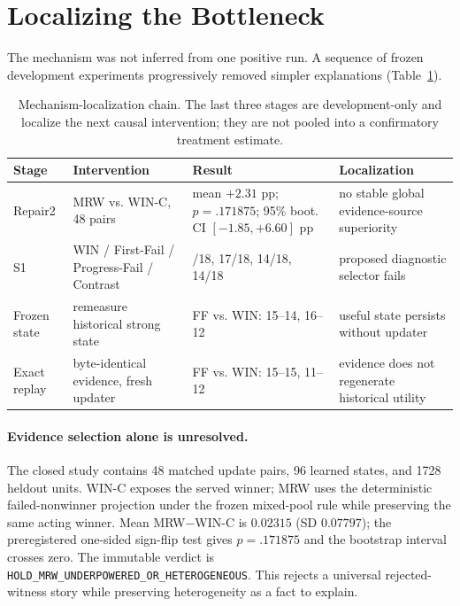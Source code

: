 \section{Localizing the Bottleneck}
\label{sec:localization}

The mechanism was not inferred from one positive run. A sequence of frozen development experiments progressively removed simpler explanations (Table~\ref{tab:evidence-chain}).

\begin{table}[t]
\centering
\footnotesize
\setlength{\tabcolsep}{3pt}
\begin{tabularx}{\linewidth}{>{\raggedright\arraybackslash}p{1.55cm}>{\raggedright\arraybackslash}X>{\raggedright\arraybackslash}X>{\raggedright\arraybackslash}X}
\toprule
Stage & Intervention & Result & Localization \\
\midrule
Repair2 & MRW vs. WIN-C, 48 pairs & mean $+2.31$ pp; $p=.171875$; 95\% boot. CI $[-1.85,+6.60]$ pp & no stable global evidence-source superiority \\
S1 & WIN / First-Fail / Progress-Fail / Contrast & 13/18, 17/18, 14/18, 14/18 & proposed diagnostic selector fails \\
Frozen state & remeasure historical strong state & FF vs. WIN: 15--14, 16--12 & useful state persists without updater \\
Exact replay & byte-identical evidence, fresh updater & FF vs. WIN: 15--15, 11--12 & evidence does not regenerate historical utility \\
\bottomrule
\end{tabularx}
\caption{Mechanism-localization chain. The last three stages are development-only and localize the next causal intervention; they are not pooled into a confirmatory treatment estimate.}
\label{tab:evidence-chain}
\end{table}

\paragraph{Evidence selection alone is unresolved.}
The closed study contains 48 matched update pairs, 96 learned states, and 1728 heldout units. WIN-C exposes the served winner; MRW uses the deterministic failed-nonwinner projection under the frozen mixed-pool rule while preserving the same acting winner. Mean MRW$-$WIN-C is $0.02315$ (SD $0.07797$); the preregistered one-sided sign-flip test gives $p=.171875$ and the bootstrap interval crosses zero. The immutable verdict is \texttt{HOLD\_MRW\_UNDERPOWERED\_OR\_HETEROGENEOUS}. This rejects a universal rejected-witness story while preserving heterogeneity as a fact to explain.

